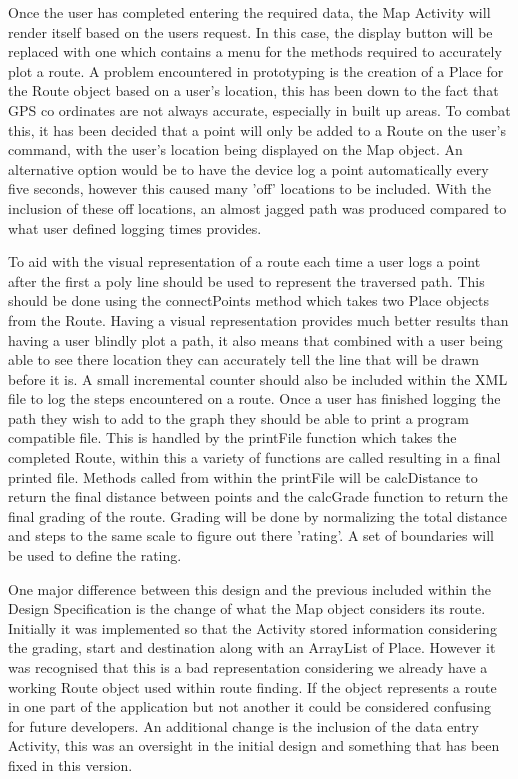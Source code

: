 Once the user has completed entering the required data, the Map Activity will render itself based on the users request. In this case, the display button will be replaced with one which contains a menu for the methods required to accurately plot a route. A problem encountered in prototyping is the creation of a Place for the Route object based on a user's location, this has been down to the fact that GPS co ordinates are not always accurate, especially in built up areas. To combat this, it has been decided that a point will only be added to a Route on the user's command, with the user's location being displayed on the Map object. An alternative option would be to have the device log a point automatically every five seconds, however this caused many 'off' locations to be included. With the inclusion of these off locations, an almost jagged path was produced compared to what user defined logging times provides. 

To aid with the visual representation of a route each time a user logs a point after the first a poly line should be used to represent the traversed path. This should be done using the connectPoints method which takes two Place objects from the Route. Having a visual representation provides much better results than having a user blindly plot a path, it also means that combined with a user being able to see there location they can accurately tell the line that will be drawn before it is. A small incremental counter should also be included within the XML file to log the steps encountered on a route. Once a user has finished logging the path they wish to add to the graph they should be able to print a program compatible file. This is handled by the printFile function which takes the completed Route, within this a variety of functions are called resulting in a final printed file. Methods called from within the printFile will be calcDistance to return the final distance between points and the calcGrade function to return the final grading of the route. Grading will be done by normalizing the total distance and steps to the same scale to figure out there 'rating'. A set of boundaries will be used to define the rating.

One major difference between this design and the previous included within the Design Specification is the change of what the Map object considers its route. Initially it was implemented so that the Activity stored information considering the grading, start and destination along with an ArrayList of Place. However it was recognised that this is a bad representation considering we already have a working Route object used within route finding. If the object represents a route in one part of the application but not another it could be considered confusing for future developers. An additional change is the inclusion of the data entry Activity, this was an oversight in the initial design and something that has been fixed in this version. 

